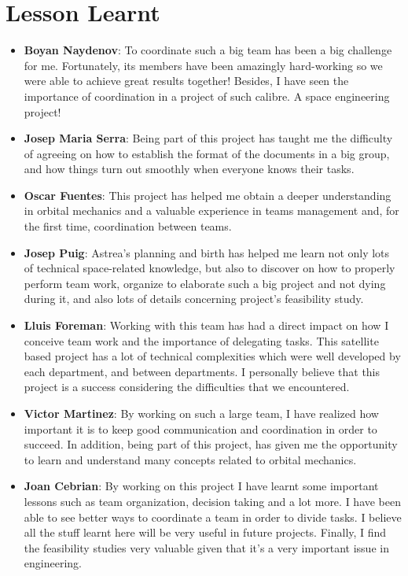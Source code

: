 \section{Lesson Learnt}
{\footnotesize
\begin{itemize}
\item \textbf{Boyan Naydenov}: To coordinate such a big team has been a big challenge for me. Fortunately, its members have been amazingly hard-working so we were able to achieve great results together! Besides, I have seen the importance of coordination in a project of such calibre. A space engineering project!

 
\item \textbf{Josep Maria Serra}: Being part of this project has taught me the difficulty of agreeing on how to establish the format of the documents in a big group, and how things turn out smoothly when everyone knows their tasks.

 
\item \textbf{Oscar Fuentes}: This project has helped me obtain a deeper understanding in orbital mechanics and a valuable experience in teams management and, for the first time, coordination between teams.

 
\item \textbf{Josep Puig}: Astrea's planning and birth has helped me learn not only lots of technical space-related knowledge, but also to discover on how to properly perform team work, organize to elaborate such a big project and not dying during it, and also lots of details concerning project's feasibility study.

 
\item \textbf{Lluis Foreman}: Working with this team has had a direct impact on how I conceive team work and the importance of delegating tasks. This satellite based project has a lot of technical complexities which were well developed by each department, and between departments. I personally believe that this project is a success considering the difficulties that we encountered. 

 
\item \textbf{Victor Martinez}: By working on such a large team, I have realized how important it is to keep good communication and coordination in order to succeed. In addition, being part of this project, has given me the opportunity to learn and understand many concepts related to orbital mechanics.

 
\item \textbf{Joan Cebrian}: By working on this project I have learnt some important lessons such as team organization, decision taking and a lot more. I have been able to see better ways to coordinate a team in order to divide tasks. I believe all the stuff learnt here will be very useful in future projects. Finally, I find the feasibility studies very valuable given that it's a very important issue in engineering. 


\end{itemize}}
